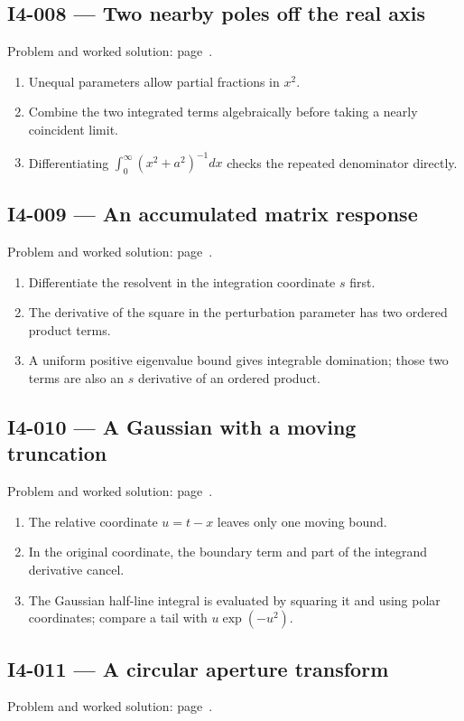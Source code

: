 \documentclass[11pt,oneside,openany]{book}
\begin{document}
\subsection*{I4-008 --- Two nearby poles off the real axis}
\label{hints:I4-008}
Problem and worked solution: page~\pageref{problem:I4-008}.

\begin{enumerate}
\item Unequal parameters allow partial fractions in \(x^2\).
\item Combine the two integrated terms algebraically before taking a nearly coincident limit.
\item Differentiating \(\int_0^\infty(x^2+a^2)^{-1}dx\) checks the repeated denominator directly.
\end{enumerate}
\subsection*{I4-009 --- An accumulated matrix response}
\label{hints:I4-009}
Problem and worked solution: page~\pageref{problem:I4-009}.

\begin{enumerate}
\item Differentiate the resolvent in the integration coordinate \(s\) first.
\item The derivative of the square in the perturbation parameter has two ordered product terms.
\item A uniform positive eigenvalue bound gives integrable domination; those two terms are also an \(s\) derivative of an ordered product.
\end{enumerate}
\subsection*{I4-010 --- A Gaussian with a moving truncation}
\label{hints:I4-010}
Problem and worked solution: page~\pageref{problem:I4-010}.

\begin{enumerate}
\item The relative coordinate \(u=t-x\) leaves only one moving bound.
\item In the original coordinate, the boundary term and part of the integrand derivative cancel.
\item The Gaussian half-line integral is evaluated by squaring it and using polar coordinates; compare a tail with \(u\exp(-u^2)\).
\end{enumerate}
\subsection*{I4-011 --- A circular aperture transform}
\label{hints:I4-011}
Problem and worked solution: page~\pageref{problem:I4-011}.
\end{document}
